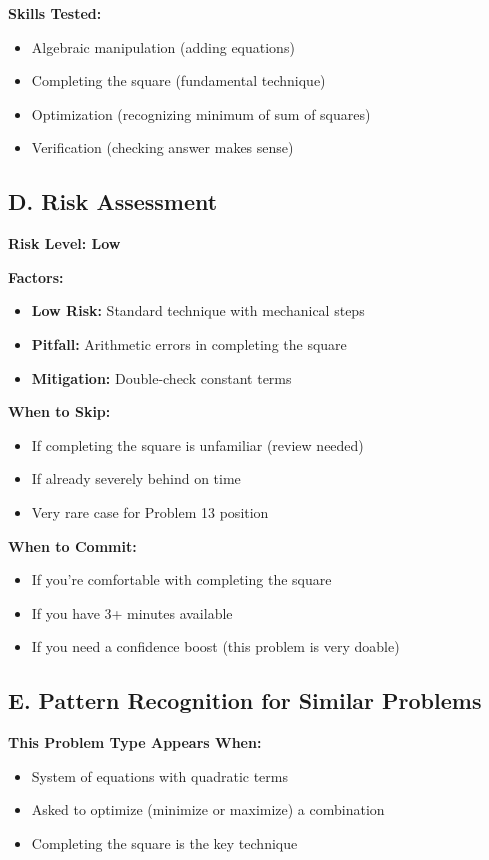 \documentclass[12pt]{article}
\begin{document}
\begin{competitionbox}
\textbf{Skills Tested:}
\begin{itemize}
    \item Algebraic manipulation (adding equations)
    \item Completing the square (fundamental technique)
    \item Optimization (recognizing minimum of sum of squares)
    \item Verification (checking answer makes sense)
\end{itemize}

\subsection*{D. Risk Assessment}

\textbf{Risk Level: Low}

\textbf{Factors:}
\begin{itemize}
    \item \textbf{Low Risk:} Standard technique with mechanical steps
    \item \textbf{Pitfall:} Arithmetic errors in completing the square
    \item \textbf{Mitigation:} Double-check constant terms
\end{itemize}

\textbf{When to Skip:}
\begin{itemize}
    \item If completing the square is unfamiliar (review needed)
    \item If already severely behind on time
    \item Very rare case for Problem 13 position
\end{itemize}

\textbf{When to Commit:}
\begin{itemize}
    \item If you're comfortable with completing the square
    \item If you have 3+ minutes available
    \item If you need a confidence boost (this problem is very doable)
\end{itemize}

\subsection*{E. Pattern Recognition for Similar Problems}

\textbf{This Problem Type Appears When:}
\begin{itemize}
    \item System of equations with quadratic terms
    \item Asked to optimize (minimize or maximize) a combination
    \item Completing the square is the key technique
\end{itemize}


\end{competitionbox}
\end{document}
